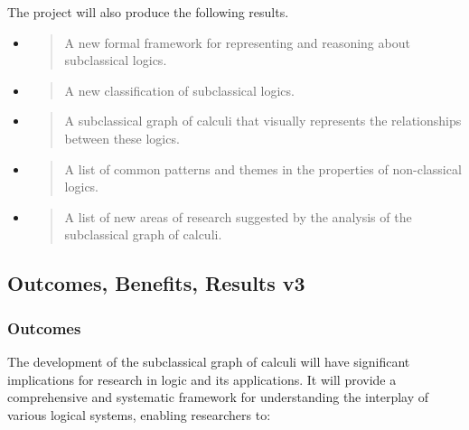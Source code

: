 The project will also produce the following results.

\begin{itemize}
\item
  \begin{quote}
  A new formal framework for representing and reasoning about
  subclassical logics.
  \end{quote}
\item
  \begin{quote}
  A new classification of subclassical logics.
  \end{quote}
\item
  \begin{quote}
  A subclassical graph of calculi that visually represents the
  relationships between these logics.
  \end{quote}
\item
  \begin{quote}
  A list of common patterns and themes in the properties of
  non-classical logics.
  \end{quote}
\item
  \begin{quote}
  A list of new areas of research suggested by the analysis of the
  subclassical graph of calculi.
  \end{quote}
\end{itemize}

\hypertarget{outcomes-benefits-results-v3}{%
\subsection{Outcomes, Benefits, Results
v3}\label{outcomes-benefits-results-v3}}

\hypertarget{outcomes-1}{%
\subsubsection{Outcomes}\label{outcomes-1}}

The development of the subclassical graph of calculi will have
significant implications for research in logic and its applications. It
will provide a comprehensive and systematic framework for understanding
the interplay of various logical systems, enabling researchers to:

